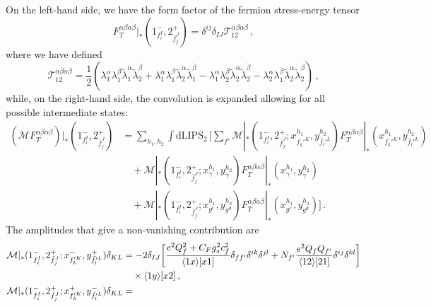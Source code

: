 \begin{subappendices}
On the left-hand side, we have the form factor of the fermion stress-energy tensor
\begin{equation}
    F_T^{\alpha\beta\dot\alpha\dot\beta}|_{*}(1_{f_i^I}^{-},2_{\bar f_j^J}^{+}) = \delta^{ij}\delta_{IJ}\mathcal T^{\alpha\beta\dot\alpha\dot\beta}_{12}\,,
\end{equation}
where we have defined
\begin{equation}
    \mathcal T^{\alpha\beta\dot\alpha\dot\beta}_{12} = \frac{1}{2}\left( \lambda_1^\alpha \lambda_1^\beta \widetilde\lambda_1^{\dot\alpha} \widetilde\lambda_2^{\dot\beta} + \lambda_1^\alpha \lambda_1^\beta \widetilde\lambda_2^{\dot\alpha} \widetilde\lambda_1^{\dot\beta} - \lambda_1^\alpha \lambda_2^\beta \widetilde\lambda_2^{\dot\alpha} \widetilde\lambda_2^{\dot\beta} - \lambda_2^\alpha \lambda_1^\beta \widetilde\lambda_2^{\dot\alpha} \widetilde\lambda_2^{\dot\beta}  \right)\,,
\end{equation}
while, on the right-hand side, the convolution is expanded allowing for all possible
intermediate states:
\begin{align}
    (\mathcal M F_T^{\alpha\beta\dot\alpha\dot\beta})|_{*}(1_{f_i^I}^{-},2_{\bar f_j^J}^{+}) &= \sum_{h_1,h_2}\int \text{dLIPS}_2\,
    \bigg[\sum_{f'}
     \mathcal M|_{*} (1_{f_i^I}^{-},2_{\bar f_j^J}^{+}; x_{f_k'^K}^{h_1},y_{\bar f_l'^L}^{h_2})F_T^{\alpha\beta\dot\alpha\dot\beta}|_{*}(x_{f_k'^K}^{h_1},y_{\bar f_l'^L}^{h_2})\nonumber \\
    &\quad + \mathcal M|_{*} (1_{f_i^I}^{-},2_{\bar f_j^J}^{+}; x_\gamma^{h_1},y_\gamma^{h_2})F_T^{\alpha\beta\dot\alpha\dot\beta}|_{*}(x_\gamma^{h_1},y_\gamma^{h_2})\nonumber \\
    &\quad+ \mathcal M|_{*} (1_{f_i^I}^{-},2_{\bar f_j^J}^{+}; x_{g^c}^{h_1},y_{g^d}^{h_2})F_T^{\alpha\beta\dot\alpha\dot\beta}|_{*}(x_{g^c}^{h_1},y_{g^d}^{h_2})
    \bigg]\,.
\end{align}
The amplitudes that give a non-vanishing contribution are
\begin{align}
    \mathcal M|_{*} (1_{f_i^I}^{-},2_{\bar f_j^J}^{+}; x_{f_k'^K}^{-},y_{\bar f_l'^L}^{+})\delta_{KL} &=
    -2\delta_{IJ}\bigg[\frac{e^2Q_f^2+C_Fg_s^2c_f^2}{\agl{1}{x}\sqr{x}{1}}\delta_{ff'}\delta^{ik}\delta^{jl} + N_{f'}\frac{e^2Q_f Q_{f'}}{\agl{1}{2}\sqr{2}{1}} \delta^{ij}\delta^{kl}\bigg]\nonumber \\&\quad\times \agl{1}{y}\sqr{x}{2}
    \,, \\
    \mathcal M|_{*} (1_{f_i^I}^{-},2_{\bar f_j^J}^{+}; x_{f_k'^K}^{+},y_{\bar f_l'^L}^{-})\delta_{KL} &=

\end{align}
\end{subappendices}
